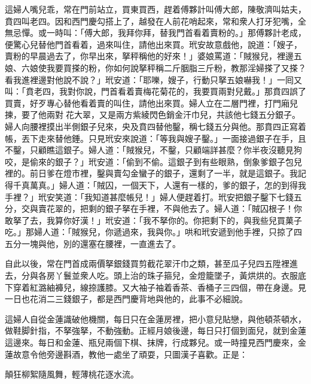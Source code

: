 這婦人嘴兒乖，常在門前站立，買東買西，趕着傅夥計叫傅大郎，陳敬濟叫姑夫，賁四叫老四。因和西門慶勾搭上了，越發在人前花哨起來，常和衆人打牙犯嘴，全無忌憚。或一時叫：「傅大郎，我拜你拜，替我門首看着賣粉的。」{}那傅夥計老成，便驚心兒替他門首看着，過來叫住，請他出來買。玳安故意戲他，說道：「嫂子，賣粉的早晨過去了，你早出來，拏秤稱他的好來！」婆娘罵道：「賊猴兒，裡邊五娘、六娘使我要買搽的粉，你如何說拏秤稱二斤胭脂三斤粉，教那淫婦搽了又搽？看我進裡邊對他說不說？」玳安道：「耶嚛，嫂子，行動只拏五娘嚇我！」一囘又叫：「賁老四，我對你說，門首看着賣梅花菊花的，我要買兩對兒戴。」{}那賁四誤了買賣，好歹專心替他看着賣的叫住，請他出來買。婦人立在二層門裡，打門廂兒揀，要了他兩對𩬆花大翠，又是兩方紫綾閃色銷金汗巾兒，共該他七錢五分銀子。婦人向腰裡摸出半側銀子兒來，央及賁四替他鑿，稱七錢五分與他。那賁四正寫着帳，丟下走來替他錘。只見玳安來說道：「等我與嫂子鑿。」一面接過銀子在手，且不鑿，只顧瞧這銀子。{}婦人道：「賊猴兒，不鑿，只顧端詳甚麼？你半夜沒聽見狗咬，是偷來的銀子？」玳安道：「偷到不偷。這銀子到有些眼熟，倒象爹銀子包兒裡的。前日爹在燈市裡，鑿與賣勾金蠻子的銀子，還剩了一半，就是這銀子。我記得千真萬真。」婦人道：「賊囚，一個天下，人還有一樣的，爹的銀子，怎的到得我手裡？」{}玳安笑道：「我知道甚麼帳兒！」婦人便趕着打。玳安把銀子鑿下七錢五分，交與賣花翠的，把剩的銀子拏在手裡，不與他去了。婦人道：「賊囚根子！你敢拏了去，我算你好漢！」玳安道：「我不拏你的。你把剩下的，與我些兒買菓子吃。」那婦人道：「賊猴兒，你遞過來，我與你。」哄和玳安遞到他手裡，只掠了四五分一塊與他，別的還塞在腰裡，一直進去了。

自此以後，常在門首成兩價拏銀錢買剪截花翠汗巾之類，甚至瓜子兒四五陞裡進去，分與各房丫鬟並衆人吃。頭上治的珠子箍兒，金燈籠墜子，黃烘烘的。衣服底下穿着紅潞紬褲兒，線捺護膝。又大袖子袖着香茶、香桶子三四個，帶在身邊。見一日也花消二三錢銀子，都是西門慶背地與他的，此事不必細說。

這婦人自從金蓮識破他機關，每日只在金蓮房裡，把小意兒貼戀，與他頓茶頓水，做鞋脚針指，不拏強拏，不動強動。正經月娘後邊，每日只打個到面兒，就到金蓮這邊來。每日和金蓮、瓶兒兩個下棋、抹牌，行成夥兒。或一時撞見西門慶來，金蓮故意令他旁邊斟酒，教他一處坐了頑耍，只圖漢子喜歡。正是：

\begin{myquote} 
顛狂柳絮隨風舞，輕薄桃花逐水流。
\end{myquote} 

